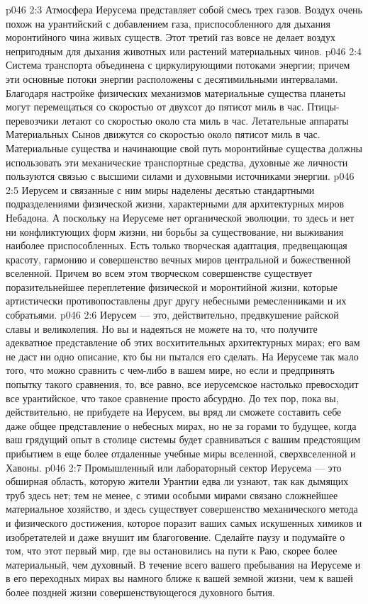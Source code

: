 \vs p046 2:3 Атмосфера Иерусема представляет собой смесь трех газов. Воздух очень похож на урантийский с добавлением газа, приспособленного для дыхания моронтийного чина живых существ. Этот третий газ вовсе не делает воздух непригодным для дыхания животных или растений материальных чинов.
\vs p046 2:4 Система транспорта объединена с циркулирующими потоками энергии; причем эти основные потоки энергии расположены с десятимильными интервалами. Благодаря настройке физических механизмов материальные существа планеты могут перемещаться со скоростью от двухсот до пятисот миль в час. Птицы\hyp{}перевозчики летают со скоростью около ста миль в час. Летательные аппараты Материальных Сынов движутся со скоростью около пятисот миль в час. Материальные существа и начинающие свой путь моронтийные существа должны использовать эти механические транспортные средства, духовные же личности пользуются связью с высшими силами и духовными источниками энергии.
\vs p046 2:5 \pc Иерусем и связанные с ним миры наделены десятью стандартными подразделениями физической жизни, характерными для архитектурных миров Небадона. А поскольку на Иерусеме нет органической эволюции, то здесь и нет ни конфликтующих форм жизни, ни борьбы за существование, ни выживания наиболее приспособленных. Есть только творческая адаптация, предвещающая красоту, гармонию и совершенство вечных миров центральной и божественной вселенной. Причем во всем этом творческом совершенстве существует поразительнейшее переплетение физической и моронтийной жизни, которые артистически противопоставлены друг другу небесными ремесленниками и их собратьями.
\vs p046 2:6 Иерусем --- это, действительно, предвкушение райской славы и великолепия. Но вы и надеяться не можете на то, что получите адекватное представление об этих восхитительных архитектурных мирах; его вам не даст ни одно описание, кто бы ни пытался его сделать. На Иерусеме так мало того, что можно сравнить с чем\hyp{}либо в вашем мире, но если и предпринять попытку такого сравнения, то, все равно, все иерусемское настолько превосходит все урантийское, что такое сравнение просто абсурдно. До тех пор, пока вы, действительно, не прибудете на Иерусем, вы вряд ли сможете составить себе даже общее представление о небесных мирах, но не за горами то будущее, когда ваш грядущий опыт в столице системы будет сравниваться с вашим предстоящим прибытием в еще более отдаленные учебные миры вселенной, сверхвселенной и Хавоны.
\vs p046 2:7 \pc Промышленный или лабораторный сектор Иерусема --- это обширная область, которую жители Урантии едва ли узнают, так как дымящих труб здесь нет; тем не менее, с этими особыми мирами связано сложнейшее материальное хозяйство, и здесь существует совершенство механического метода и физического достижения, которое поразит ваших самых искушенных химиков и изобретателей и даже внушит им благоговение. Сделайте паузу и подумайте о том, что этот первый мир, где вы остановились на пути к Раю, скорее более материальный, чем духовный. В течение всего вашего пребывания на Иерусеме и в его переходных мирах вы намного ближе к вашей земной жизни, чем к вашей более поздней жизни совершенствующегося духовного бытия.
